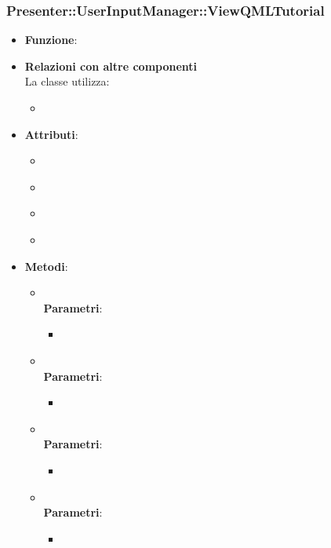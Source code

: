 \subsubsection{Presenter::UserInputManager::ViewQMLTutorial}
\begin{itemize}
\item\textbf{Funzione}:
\item\textbf{Relazioni con altre componenti}\\
La classe utilizza:
	\begin{itemize}
		\item
	\end{itemize}
\item\textbf{Attributi}:
	\begin{itemize}
		\item\code{}\\
		\item\code{}\\
		\item\code{}\\
		\item\code{}\\
	\end{itemize}
\item\textbf{Metodi}:
	\begin{itemize}
		\item\code{}\\
		\textbf{Parametri}:
			\begin{itemize}
				\item\code{}\\
			\end{itemize}
		\item\code{}\\
		\textbf{Parametri}:
			\begin{itemize}
				\item\code{}\\
			\end{itemize}
		\item\code{}\\
		\textbf{Parametri}:
			\begin{itemize}
				\item\code{}\\
			\end{itemize}
		\item\code{}\\
		\textbf{Parametri}:
			\begin{itemize}
				\item\code{}\\
			\end{itemize}
	\end{itemize}
\end{itemize}

